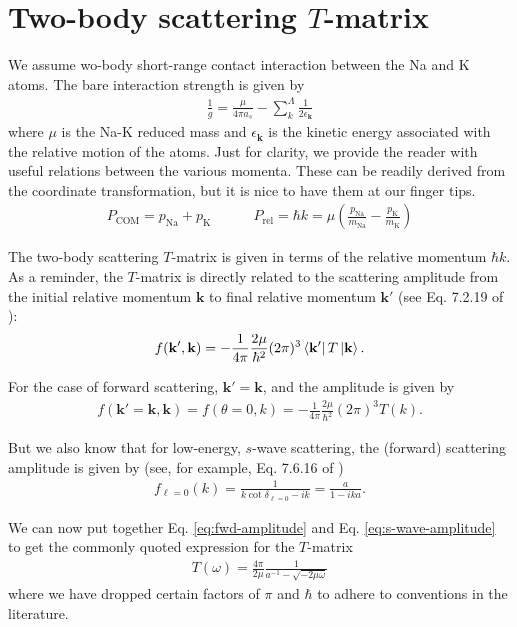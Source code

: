 \documentclass{article}
\theoremstyle{definition}
\begin{document}
\section{Two-body scattering $T$-matrix}

We assume wo-body short-range contact interaction between the Na and K atoms. The bare interaction strength is given by 
\begin{align}
 \frac{1}{g} = \frac{\mu}{4\pi a_s} - \sum_k^\Lambda  \frac{1}{2\epsilon_\mathbf{k}} 
\end{align}
where $\mu$ is the Na-K reduced mass and $\epsilon_\mathbf{k}$ is the kinetic energy associated with the relative motion of the atoms. Just for clarity, we provide the reader with useful relations between the various momenta. These can be readily derived from the coordinate transformation, but it is nice to have them at our finger tips.
\begin{align}
P_\text{COM} = p_\text{Na} + p_\text{K}
\quad\quad\quad 
P_\text{rel} = \hbar k = \mu \left( \frac{p_\text{Na}}{m_\text{Na}} - \frac{p_\text{K}}{m_\text{K}}  \right)
\end{align}

\noindent The two-body scattering $T$-matrix is given in terms of the relative momentum $\hbar k$. As a reminder, the $T$-matrix is directly related to the scattering amplitude from the initial relative momentum  $\mathbf{k}$ to final relative momentum $\mathbf{k}'$ (see Eq. 7.2.19 of \cite{sakurai1995modern}):
\begin{align}
f(\mathbf{k}',\mathbf{k}) = -\frac{1}{4\pi} \frac{2\mu}{\hbar^2} (2\pi)^3 \bra{\mathbf{k}' } T \ket{\mathbf{k}}.
\end{align}

\noindent For the case of forward scattering, $\mathbf{k}' = \mathbf{k}$, and the amplitude is given by 
\begin{align}\label{eq:fwd-amplitude}
f(\mathbf{k}'=\mathbf{k},\mathbf{k}) = f(\theta = 0, k) =  -\frac{1}{4\pi} \frac{2\mu}{\hbar^2} (2\pi)^3 T(k). 
\end{align}

\noindent But we also know that for low-energy, $s$-wave scattering, the (forward) scattering amplitude is given by (see, for example, Eq. 7.6.16 of \cite{sakurai1995modern})
\begin{align}\label{eq:s-wave-amplitude}
f_{\ell = 0}(k) = \frac{1}{k\cot \delta_{\ell = 0} - ik}  = \frac{a}{1 - ika}.
\end{align}

\noindent We can now put together Eq. \eqref{eq:fwd-amplitude} and Eq. \eqref{eq:s-wave-amplitude} to get the commonly quoted expression for the $T$-matrix
\begin{align}\label{eq:T-matrix}
\boxed{T(\omega) =  \frac{4\pi}{2\mu} \frac{1}{a^{-1} - \sqrt{- 2\mu\omega}}}
\end{align}
where we have dropped certain factors of $\pi$ and $\hbar$ to adhere to conventions in the literature.\\
\end{document}
